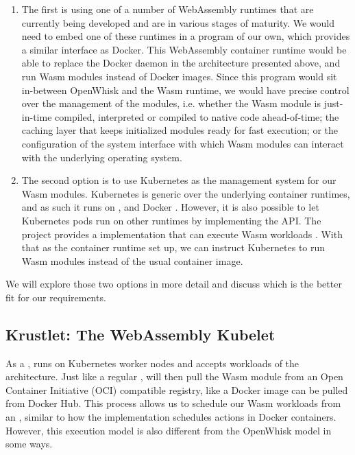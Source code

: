 \begin{enumerate}
    \item The first is using one of a number of WebAssembly runtimes that are currently being developed and are in various stages of maturity. We would need to embed one of these runtimes in a program of our own, which provides a similar interface as Docker. This WebAssembly container runtime would be able to replace the Docker daemon in the architecture presented above, and run Wasm modules instead of Docker images. Since this program would sit in-between OpenWhisk and the Wasm runtime, we would have precise control over the management of the modules, i.e. whether the Wasm module is just-in-time compiled, interpreted or compiled to native code ahead-of-time; the caching layer that keeps initialized modules ready for fast execution; or the configuration of the system interface with which Wasm modules can interact with the underlying operating system.
    \item The second option is to use Kubernetes as the management system for our Wasm modules. Kubernetes is generic over the underlying container runtimes, and as such it runs on ,  and Docker \cite{Kub2021}. However, it is also possible to let Kubernetes pods run on other runtimes by implementing the  API. The  project provides a  implementation that can execute Wasm workloads \cite{Krustlet2021}. With that as the container runtime set up, we can instruct Kubernetes to run Wasm modules instead of the usual container image.
\end{enumerate}

We will explore those two options in more detail and discuss which is the better fit for our requirements.

\subsection{Krustlet: The WebAssembly Kubelet}

As a ,  runs on Kubernetes worker nodes and accepts workloads of the  architecture. Just like a regular ,  will then pull the Wasm module from an Open Container Initiative (OCI) compatible registry, like a Docker image can be pulled from Docker Hub. This process allows us to schedule our Wasm workloads from an , similar to how the  implementation schedules actions in Docker containers. However, this execution model is also different from the OpenWhisk model in some ways.

